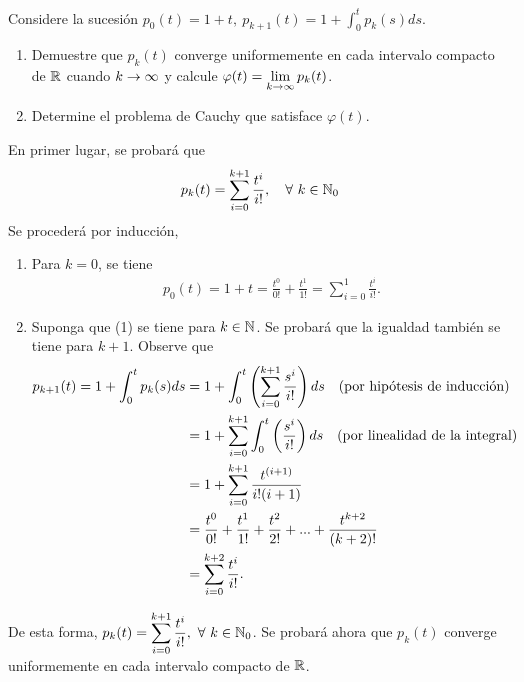 \documentclass[../main.tex]{subfiles}
\begin{document}
    \begin{enunciado}
        Considere la sucesión $\displaystyle p_0(t) = 1 + t,\ p_{k+1}(t) = 1 + \int_{0}^{t} p_k(s)ds$.
        
        \begin{enumerate}
            \item Demuestre que $p_k(t)$ converge uniformemente en cada intervalo compacto de $\mathbb{R}$ cuando $k \rightarrow \infty$ y calcule $\displaystyle \varphi(t) = \lim_{k \rightarrow \infty} p_k(t)$.
            \item Determine el problema de Cauchy que satisface $\varphi(t)$.
        \end{enumerate}
    \end{enunciado}
    \begin{demostracion}
        En primer lugar, se probará que
        \begin{align}
            p_k(t) = \sum_{i=0}^{k+1} \frac{t^i}{i!}, \quad \forall\ k \in \mathbb{N}_0
        \end{align}
        Se procederá por inducción,
        \begin{enumerate}
            \item Para $k = 0$, se tiene
                \begin{align*}
                    p_0(t) = 1 + t = \frac{t^0}{0!} + \frac{t^1}{1!} = \sum_{i=0}^{1} \frac{t^i}{i!}.
                \end{align*}
            \item Suponga que (1) se tiene para $k \in \mathbb{N}$. Se probará que la igualdad también se tiene para $k+1$. Observe que
                \begin{align*}
                    p_{k+1}(t) = 1 + \int_{0}^{t} p_{k} (s) ds & = 1 + \int_{0}^{t} \left( \sum_{i=0}^{k+1} \frac{s^i}{i!} \right) ds \quad \text{(por hipótesis de inducción)}\\
                    & = 1 + \sum_{i=0}^{k+1} \int_{0}^{t} \left( \frac{s^i}{i!} \right) ds \quad \text{(por linealidad de la integral)}\\
                    &= 1 + \sum_{i=0}^{k+1} \frac{t^{(i+1)}}{i!(i+1)}\\
                    &= \frac{t^0}{0!} + \frac{t^1}{1!} + \frac{t^{2}}{2!} + ... + \frac{t^{k+2}}{(k+2)!}\\
                    &= \sum_{i=0}^{k+2} \frac{t^i}{i!}.
                \end{align*}
        \end{enumerate}
        De esta forma, $\displaystyle p_k(t) = \sum_{i=0}^{k+1} \frac{t^i}{i!}, \ \forall\ k \in \mathbb{N}_0$. Se probará ahora que $p_k(t)$ converge uniformemente en cada intervalo compacto de $\mathbb{R}$. 
        

\end{demostracion}
\end{document}
